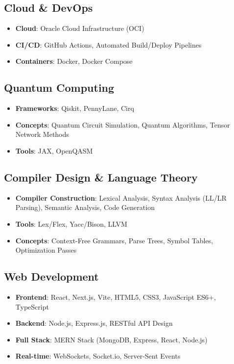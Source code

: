 \documentclass[a4paper,12pt]{article}
\begin{document}
\subsection*{Cloud \& DevOps}
\begin{itemize}[nosep,after=\strut, leftmargin=1em, itemsep=1pt]
\item \textbf{Cloud}: Oracle Cloud Infrastructure (OCI)
\item \textbf{CI/CD}: GitHub Actions, Automated Build/Deploy Pipelines
\item \textbf{Containers}: Docker, Docker Compose
\end{itemize}

\subsection*{Quantum Computing}
\begin{itemize}[nosep,after=\strut, leftmargin=1em, itemsep=1pt]
\item \textbf{Frameworks}: Qiskit, PennyLane, Cirq
\item \textbf{Concepts}: Quantum Circuit Simulation, Quantum Algorithms, Tensor Network Methods
\item \textbf{Tools}: JAX, OpenQASM
\end{itemize}

\subsection*{Compiler Design \& Language Theory}
\begin{itemize}[nosep,after=\strut, leftmargin=1em, itemsep=1pt]
\item \textbf{Compiler Construction}: Lexical Analysis, Syntax Analysis (LL/LR Parsing), Semantic Analysis, Code Generation
\item \textbf{Tools}: Lex/Flex, Yacc/Bison, LLVM
\item \textbf{Concepts}: Context-Free Grammars, Parse Trees, Symbol Tables, Optimization Passes
\end{itemize}

\subsection*{Web Development}
\begin{itemize}[nosep,after=\strut, leftmargin=1em, itemsep=1pt]
\item \textbf{Frontend}: React, Next.js, Vite, HTML5, CSS3, JavaScript ES6+, TypeScript
\item \textbf{Backend}: Node.js, Express.js, RESTful API Design
\item \textbf{Full Stack}: MERN Stack (MongoDB, Express, React, Node.js)
\item \textbf{Real-time}: WebSockets, Socket.io, Server-Sent Events
\end{itemize}
\end{document}
